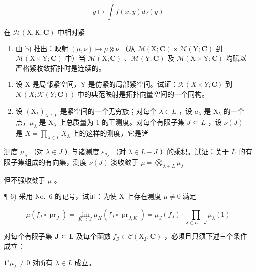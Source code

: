 \[
y \mapsto \int f (x, y) d \nu (y)
\]

在 \(\mathcal{H}(\mathrm{X},\mathrm{K};\mathbf{C})\) 中相对紧

\begin{enumerate}
\def\labelenumi{\alph{enumi})}
\setcounter{enumi}{2}
\tightlist
\item
  由 b) 推出：映射 \((\mu, \nu) \mapsto \mu \otimes \nu\) （从 \(\mathcal{M}(\mathrm{X}; \mathbf{C}) \times \mathcal{M}(\mathrm{Y}; \mathbf{C})\) 到 \(\mathcal{M}(\mathrm{X} \times \mathrm{Y}; \mathbf{C})\) 中）当 \(\mathcal{M}(\mathrm{X}; \mathbf{C})\) 、\(\mathcal{M}(\mathrm{Y}; \mathbf{C})\) 及 \(\mathcal{M}(\mathrm{X} \times \mathrm{Y}; \mathbf{C})\) 均赋以严格紧收敛拓扑时是连续的。
\end{enumerate}

\begin{enumerate}
\def\labelenumi{\arabic{enumi})}
\setcounter{enumi}{3}
\item
  设 X 是局部紧空间，Y 是仿紧的局部紧空间。试证：\(\mathcal{K}(X \times Y; \mathbf{C})\) 到 \(\mathcal{K}(X; \mathcal{K}(Y; \mathbf{C}))\) 中的典范映射是拓扑向量空间的一个同构。
\item
  设 \((\mathrm{X}_{\lambda})_{\lambda \in L}\) 是紧空间的一个无穷族；对每个 \(\lambda \in L\) ，设 \(a_{\lambda}\) 是 \(\mathrm{X}_{\lambda}\) 的一个点，\(\mu_{\lambda}\) 是 \(\mathrm{X}_{\lambda}\) 上总质量为 1 的正测度。对每个有限子集 \(J\) ⊂ \(L\) ，设 \(\nu(J)\) 是 \(X = \prod_{\lambda \in L} X_{\lambda}\) 上的这样的测度，它是诸
\end{enumerate}

测度 \(\mu_{\lambda}\) （对 \(\lambda \in J\) ）与诸测度 \(\varepsilon_{a_{\lambda}}\) （对 \(\lambda \in L - J\) ）的乘积。试证：关于 \(L\) 的有限子集组成的有向集，测度 \(\nu(J)\) 淡收敛于 \(\mu = \bigotimes_{\lambda \in L} \mu_{\lambda}\)

但不强收敛于 \(\mu\) 。

¶ 6) 采用 No.~6 的记号，试证：为使 X 上存在测度 \(\mu \neq 0\) 满足

\[
\mu \left(f _ {J} \circ \operatorname{pr} _ {J}\right) = \lim _ {K \supset J} \mu_ {K} \left(f _ {J} \circ \operatorname{pr} _ {J, K}\right) = \mu_ {J} \left(f _ {J}\right) \cdot \prod_ {\lambda \in L - J} \mu_ {\lambda} (1)\tag{1}
\]

对每个有限子集 \(\mathbf{J}\) ⊂ \(\mathbf{L}\) 及每个函数 \(f_{\mathbf{J}} \in \mathcal{C}(\mathrm{X}_{\mathbf{J}}; \mathbf{C})\) ，必须且只须下述三个条件成立：

\(1^{\circ} \mu_{\lambda} \neq 0\) 对所有 \(\lambda \in L\) 成立。

